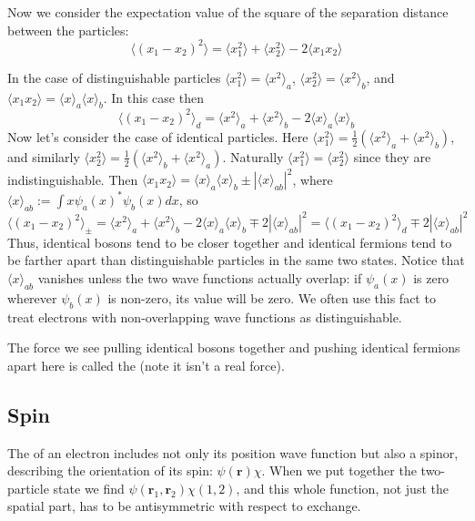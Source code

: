 \documentclass[12pt, a4paper, oneside, openright, titlepage]{book}
\begin{document}
Now we consider the expectation value of the square of the separation distance between the particles: \begin{equation*}
    \langle (x_1-x_2)^2\rangle = \langle x_1^2\rangle + \langle x_2^2\rangle - 2\langle x_1x_2\rangle
\end{equation*}

In the case of distinguishable particles $\langle x_1^2\rangle = \langle x^2\rangle_a$, $\langle x_2^2\rangle = \langle x^2\rangle_b$, and $\langle x_1x_2\rangle = \langle x\rangle_a\langle x\rangle_b$. In this case then \begin{equation*}
    \langle (x_1-x_2)^2\rangle_d = \langle x^2\rangle_a + \langle x^2\rangle_b - 2\langle x\rangle_a\langle x\rangle_b
\end{equation*}
Now let's consider the case of identical particles. Here $\langle x_1^2\rangle = \frac{1}{2}(\langle x^2\rangle_a+\langle x^2\rangle_b)$, and similarly $\langle x_2^2\rangle = \frac{1}{2}(\langle x^2\rangle_b+\langle x^2\rangle_a)$. Naturally $\langle x_1^2\rangle = \langle x_2^2\rangle$ since they are indistinguishable. Then $\langle x_1x_2\rangle = \langle x\rangle_a\langle x\rangle_b \pm |\langle x\rangle_{ab}|^2$, where $\langle x\rangle_{ab} := \int x\psi_a(x)^*\psi_b(x)dx$, so \begin{equation*}
    \langle (x_1-x_2)^2\rangle_{\pm} = \langle x^2\rangle_a+\langle x^2\rangle_b - 2\langle x\rangle_a\langle x\rangle_b \mp 2|\langle x\rangle_{ab}|^2 = \langle (x_1-x_2)^2\rangle_d \mp 2|\langle x\rangle_{ab}|^2
\end{equation*}
Thus, identical bosons tend to be closer together and identical fermions tend to be farther apart than distinguishable particles in the same two states. Notice that $\langle x\rangle_{ab}$ vanishes unless the two wave functions actually overlap: if $\psi_a(x)$ is zero wherever $\psi_b(x)$ is non-zero, its value will be zero. We often use this fact to treat electrons with non-overlapping wave functions as distinguishable.

The force we see pulling identical bosons together and pushing identical fermions apart here is called the  (note it isn't a real force).

\subsection{Spin}

The  of an electron includes not only its position wave function but also a spinor, describing the orientation of its spin: $\psi(\mathbf{r})\chi$. When we put together the two-particle state we find $\psi(\mathbf{r}_1,\mathbf{r}_2)\chi(1,2)$, and this whole function, not just the spatial part, has to be antisymmetric with respect to exchange.
\end{document}
